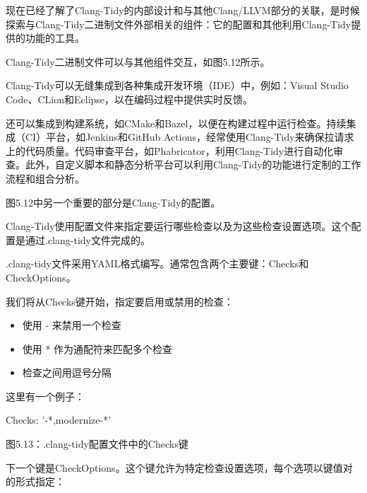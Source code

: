 
现在已经了解了Clang-Tidy的内部设计和与其他Clang/LLVM部分的关联，是时候探索与Clang-Tidy二进制文件外部相关的组件：它的配置和其他利用Clang-Tidy提供的功能的工具。


Clang-Tidy二进制文件可以与其他组件交互，如图5.12所示。


Clang-Tidy可以无缝集成到各种集成开发环境（IDE）中，例如：Visual Studio Code、CLion和Eclipse，以在编码过程中提供实时反馈。

还可以集成到构建系统，如CMake和Bazel，以便在构建过程中运行检查。持续集成（CI）平台，如Jenkins和GitHub Actions，经常使用Clang-Tidy来确保拉请求上的代码质量。代码审查平台，如Phabricator，利用Clang-Tidy进行自动化审查。此外，自定义脚本和静态分析平台可以利用Clang-Tidy的功能进行定制的工作流程和组合分析。

图5.12中另一个重要的部分是Clang-Tidy的配置。


Clang-Tidy使用配置文件来指定要运行哪些检查以及为这些检查设置选项。这个配置是通过.clang-tidy文件完成的。

.clang-tidy文件采用YAML格式编写。通常包含两个主要键：Checks和CheckOptions。

我们将从Checks键开始，指定要启用或禁用的检查：

\begin{itemize}
\item
使用 - 来禁用一个检查

\item
使用 * 作为通配符来匹配多个检查

\item
检查之间用逗号分隔
\end{itemize}

这里有一个例子：

\begin{shell}
Checks: '-*,modernize-*'
\end{shell}

\begin{center}
图5.13：.clang-tidy配置文件中的Checks键
\end{center}

下一个键是CheckOptions。这个键允许为特定检查设置选项，每个选项以键值对的形式指定：

